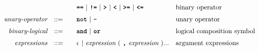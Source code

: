 \begin{alignat*}{9}
&&                      &&   &\quad && \textbf{\texttt{==}}\ |\ \textbf{\texttt{!=}}\ |\ \texttt{\textbf{>}}\ |\ \texttt{\textbf{<}}\ |\ \texttt{\textbf{>=}}\ |\ \texttt{\textbf{<=}}     && \textrm{binary operator}\\[1mm]
&& \textit{unary-operator}    
                        && ::= &\quad && \textbf{\texttt{not}}\ |\ \textbf{\texttt{-}}
                        && \textrm{unary operator}\\[1mm]
&& \textit{binary-logical}   && ::=  &\quad &&  \textbf{\texttt{and}}\ |\ \texttt{\textbf{or}}
                                          && \textrm{logical composition symbol}\\[1mm]
&& \textit{expressions}  && ::= &\quad && \epsilon\ | \ \textit{expression}\ (
                                                               \ \textbf{\texttt{,}} \
                                                                 \textit{expression} \ 
                                                                      ) ...
                                                            && \textrm{argument expressions}
\end{alignat*}
